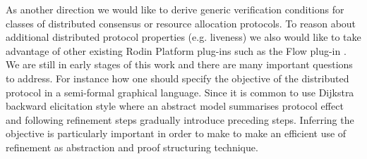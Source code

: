 \documentclass{llncs}
\begin{document}
	As another direction we would like to derive generic verification conditions for classes of distributed consensus or resource allocation protocols. To reason about additional distributed protocol properties (e.g. liveness) we also would like to take advantage of other existing Rodin Platform plug-ins such as the Flow plug-in \cite{flow}. We are still in early stages of this work and there are many important questions to address. For instance how one should specify the objective of the distributed protocol in a semi-formal graphical language. Since it is common to use Dijkstra backward elicitation style where an abstract model summarises protocol effect and following refinement steps gradually introduce preceding steps. Inferring the objective is particularly important in order to make to make an efficient use of refinement as abstraction and proof structuring technique. 
	
	
	
	
	
	
	
	
\end{document}
